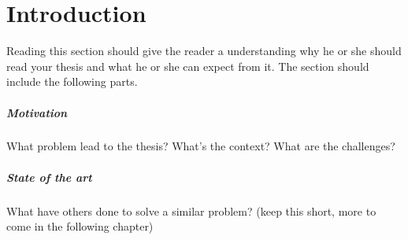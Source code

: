 \documentclass{listhesis}
\begin{document}
\maketitle
\cleardoublepage

\makeabstract
\clearpage

\tableofcontents
\clearpage
\listoffigures
\clearpage
\listoftables
\clearpage


\chapter{Introduction}
Reading this section should give the reader a understanding why he or
she should read your thesis and what he or she can expect from it. The
section should include the following parts.

\paragraph{Motivation}
What problem lead to the thesis? What's the context? What are the
challenges?

\paragraph{State of the art}
What have others done to solve a similar problem? (keep this short, more
to come in the following chapter)
\end{document}
